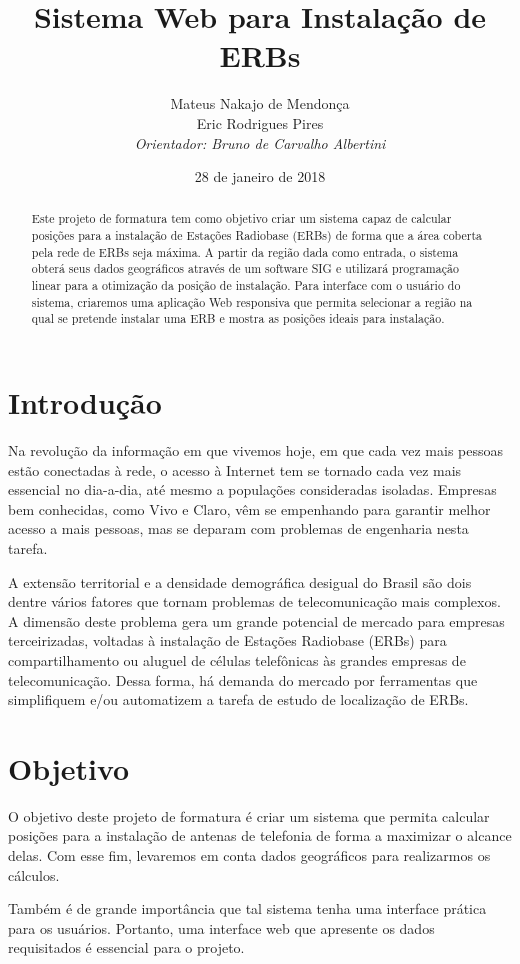 \documentclass[12pt,a4paper]{article}
\title{Sistema Web para Instalação de ERBs}
\author{Mateus Nakajo de Mendonça  \\
	Eric Rodrigues Pires  \\
	\em{Orientador: Bruno de Carvalho Albertini}
	}
\date{28 de janeiro de 2018}
\begin{document}
\maketitle

\begin{abstract}
Este projeto de formatura tem como objetivo criar um sistema capaz de calcular
posições para a instalação de Estações Radiobase (ERBs) de forma que a área
coberta pela rede de ERBs seja máxima. A partir da região dada como entrada, o
sistema obterá seus dados geográficos através de um software SIG e utilizará
programação linear para a otimização da posição de instalação. Para interface
com o usuário do sistema, criaremos uma aplicação Web responsiva que permita
selecionar a região na qual se pretende instalar uma ERB e mostra as posições
ideais para instalação.
\end{abstract}

\section{Introdução}
Na revolução da informação em que vivemos hoje, em que cada vez mais pessoas
estão conectadas à rede, o acesso à Internet tem se tornado cada vez mais
essencial no dia-a-dia, até mesmo a populações consideradas isoladas. Empresas
bem conhecidas, como Vivo e Claro, vêm se empenhando para garantir melhor
acesso a mais pessoas, mas se deparam com problemas de engenharia nesta
tarefa.

A extensão territorial e a densidade demográfica desigual do Brasil são dois
dentre vários fatores que tornam problemas de telecomunicação mais complexos.
A dimensão deste problema gera um grande potencial de mercado para empresas
terceirizadas, voltadas à instalação de Estações Radiobase (ERBs) para
compartilhamento ou aluguel de células telefônicas às grandes empresas de
telecomunicação. Dessa forma, há demanda do mercado por ferramentas que
simplifiquem e/ou automatizem a tarefa de estudo de localização de ERBs.

\section{Objetivo}
O objetivo deste projeto de formatura é criar um sistema que permita calcular
posições para a instalação de antenas de telefonia de forma a maximizar o
alcance delas. Com esse fim, levaremos em conta dados geográficos para
realizarmos os cálculos.

Também é de grande importância que tal sistema tenha uma interface prática
para os usuários. Portanto, uma interface web que apresente os dados
requisitados é essencial para o projeto.
\end{document}
